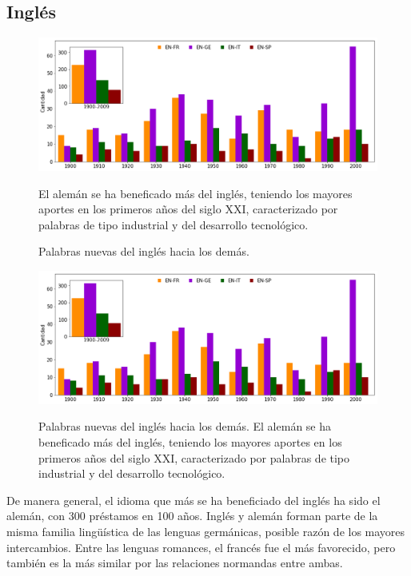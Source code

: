 \subsection{Inglés} %

\begin{figure} %
	\centering
	\includegraphics[scale=.38]{Cap_3/NC_EN.png}
	\label{fig.NC_EN}
	\caption{Palabras nuevas del inglés hacia los demás.}
	\smallskip
	\small
	El alemán se ha beneficado más del inglés, teniendo los mayores aportes en los primeros años del siglo XXI, caracterizado por palabras de tipo industrial y del desarrollo tecnológico.
\end{figure} %

\begin{figure} %
	\centering
	\includegraphics[scale=.38]{Cap_3/NC_EN.png}
	\label{fig.NC_EN}
	\caption{Palabras nuevas del inglés hacia los demás.
	El alemán se ha beneficado más del inglés, teniendo los mayores aportes
en los primeros años del siglo XXI, caracterizado por palabras de tipo
industrial y del desarrollo tecnológico.
}
\end{figure} %
De manera general, el idioma que más se ha beneficiado del inglés ha sido el
alemán, con 300 préstamos en 100 años.  Inglés y alemán forman parte de la
misma familia lingüística de las lenguas germánicas,  posible razón de los
mayores intercambios. Entre las lenguas romances, el francés fue el más
favorecido, pero también es la más similar por las relaciones normandas entre
ambas.

